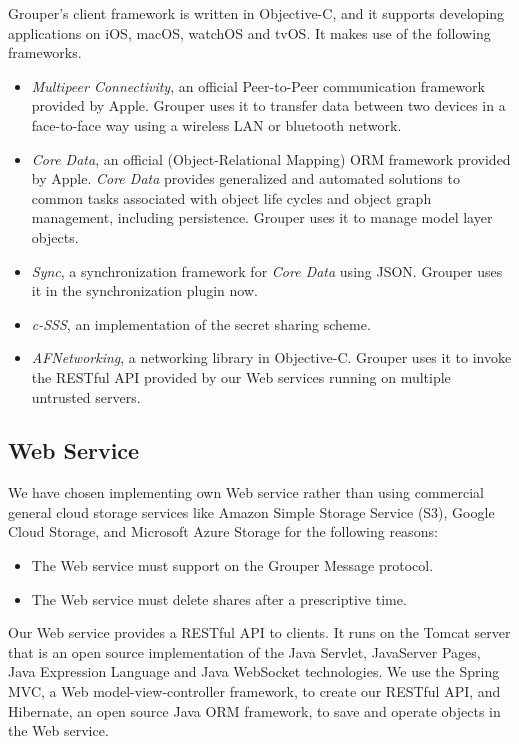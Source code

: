 Grouper's client framework is written in Objective-C, and it supports developing applications on iOS, macOS, watchOS and tvOS.
It makes use of the following frameworks.   

\begin{itemize}
	\setlength{\itemsep}{1pt}
	\setlength{\parskip}{0pt}
	\setlength{\parsep}{0pt}
	\item 
	\emph{Multipeer Connectivity}\cite{mc},  an official Peer-to-Peer communication framework provided by Apple. 
	Grouper uses it to transfer data between two devices in a face-to-face way using a wireless LAN or bluetooth network.
	\item 
	\emph{Core Data}\cite{coredata}, an official (Object-Relational Mapping) ORM framework provided by Apple.
	\emph{Core Data} provides generalized and automated solutions to common tasks associated with object life cycles and object graph management, including persistence. 
	Grouper uses it to manage model layer objects. 
	\item 
	\emph{Sync}\cite{sync}, a synchronization framework for \emph{Core Data} using JSON.
	Grouper uses it in the synchronization plugin now.
	\item 
	\emph{c-SSS}\cite{c-sss}, an implementation of the secret sharing scheme.
	\item 
	\emph{AFNetworking}\cite{afnetworking}, a networking library in Objective-C. 
	Grouper uses it to invoke the RESTful API provided by our Web services running on multiple untrusted servers. 
\end{itemize}

\subsection{Web Service}

We have chosen implementing own Web service rather than using commercial general cloud storage services like Amazon Simple Storage Service (S3), Google Cloud Storage, and Microsoft Azure Storage for the following reasons:

\begin{itemize}
	\setlength{\itemsep}{1pt}
	\setlength{\parskip}{0pt}
	\setlength{\parsep}{0pt}
	\item The Web service must support on the Grouper Message protocol.
	\item The Web service must delete shares after a prescriptive time.
\end{itemize}

Our Web service provides a RESTful API to clients.
It runs on the Tomcat server\cite{tomcat} that is an open source implementation of the Java Servlet, JavaServer Pages, Java Expression Language and Java WebSocket technologies. 
We use the Spring MVC\cite{spring}, a  Web model-view-controller framework, to create our RESTful API, and Hibernate\cite{hibernate}, an open source Java ORM framework, to save and operate objects in the Web service. 

